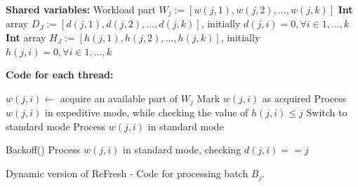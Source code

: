 \begin{algorithm}[htbp]
    \footnotesize
    \vspace*{2mm}
    
    \begin{algorithmic}[1]
    
    \State \textbf{Shared variables:}
    \State Workload part $\mathit{W_j} := \mathit{[w(j,1), w(j,2), \ldots, w(j,k)]}$ \label{alg:DRefresh:w}
    \State \textbf{Int} array $\mathit{D_J} := \mathit{[d(j,1), d(j,2), \ldots, d(j,k)]}$, initially $\mathit{d(j,i)} = 0, \forall i \in {1,...,k}$ \label{alg:DRefresh:d}
    \State \textbf{Int} array $\mathit{H_J} := \mathit{[h(j,1), h(j,2), \ldots, h(j,k)]}$, initially $\mathit{h(j,i)} = 0, \forall i \in {1,...,k}$ \label{alg:DRefresh:h}
    
    \vspace*{1mm}
    \State \textbf{Code for each thread:}
    
         \label{alg:DRefresh:process:start}
            \State $\mathit{w(j,i)} \gets$ acquire an available part of $\mathit{W_j}$
            \State Mark $\mathit{w(j,i)}$ as acquired \label{alg:DFreSh:acquire-part}
             \label{alg:DRefresh:process:if}
                \State Process $\mathit{w(j,i)}$ in expeditive mode, while checking the value of $h(j,i) \leq j$ \label{alg:DRefresh:process:expeditive}
                \label{alg:DFreSh:switch-mode}
                    \State Switch to standard mode
                \EndIf
            \Else
                \State Process $\mathit{w(j,i)}$ in standard mode \label{alg:DRefresh:process:standard}
            \EndIf
            \State {} \label{alg:DRefresh:d:increase}
        \EndWhile
        
         \label{alg:DRefresh:scan:ForAll} 
            \State Backoff() \label{alg:DRefresh:help:backoff}
            \State Process $\mathit{w(j,i)}$ in standard mode, checking $\mathit{d(j,i)} == j$
            \label{alg:DRefresh:help:d:true}
        \EndFor
    \EndProcedure
    
    \end{algorithmic}
    
    \caption{Dynamic version of ReFresh - Code for processing batch $B_j$.}
    \label{alg:DRefresh}
    \end{algorithm}

